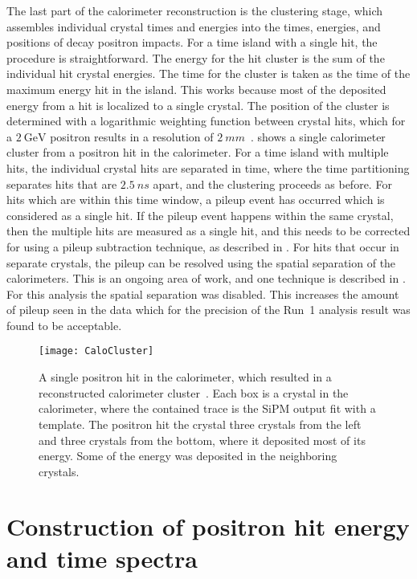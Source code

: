 The last part of the calorimeter reconstruction is the clustering stage, which assembles individual crystal times and energies into the times, energies, and positions of decay positron impacts. For a time island with a single hit, the procedure is straightforward. The energy for the hit cluster is the sum of the individual hit crystal energies. The time for the cluster is taken as the time of the maximum energy hit in the island. This works because most of the deposited energy from a hit is localized to a single crystal. The position of the cluster is determined with a logarithmic weighting function between crystal hits, which for a $\SI{2}{\GeV}$ positron results in a resolution of $\SI{2}{mm}$~\cite{AFThesis}.  shows a single calorimeter cluster from a positron hit in the calorimeter. For a time island with multiple hits, the individual crystal hits are separated in time, where the time partitioning separates hits that are $\SI{2.5}{ns}$ apart, and the clustering proceeds as before. For hits which are within this time window, a pileup event has occurred which is considered as a single hit. If the pileup event happens within the same crystal, then the multiple hits are measured as a single hit, and this needs to be corrected for using a pileup subtraction technique, as described in . For hits that occur in separate crystals, the pileup can be resolved using the spatial separation of the calorimeters. This is an ongoing area of work, and one technique is described in . For this analysis the spatial separation was disabled. This increases the amount of pileup seen in the data which for the precision of the Run~1 analysis result was found to be acceptable. 


\begin{figure}
    \centering
    \texttt{[image: CaloCluster]}
    \caption[Calorimeter cluster from SiPM traces fit with templates]{A single positron hit in the calorimeter, which resulted in a reconstructed calorimeter cluster~\cite{AFThesis}. Each box is a crystal in the calorimeter, where the contained trace is the SiPM output fit with a template. The positron hit the crystal three crystals from the left and three crystals from the bottom, where it deposited most of its energy. Some of the energy was deposited in the neighboring crystals.}
    \label{fig:CaloCluster}
\end{figure}



\section{Construction of positron hit energy and time spectra}
\label{sec:Histogramming}


